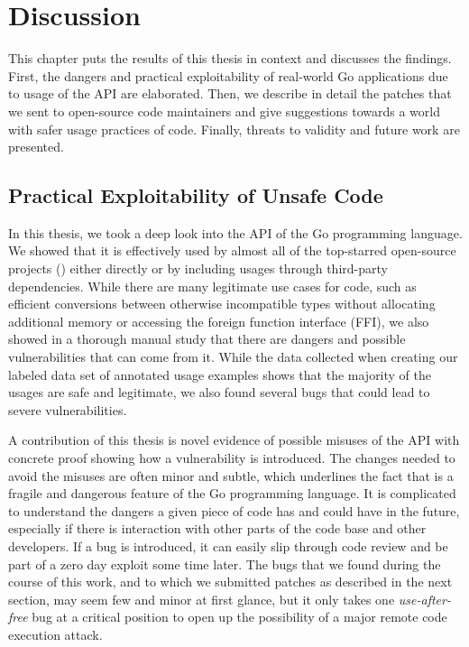 
\chapter{Discussion}\label{ch:discussion}

This chapter puts the results of this thesis in context and discusses the findings.
First, the dangers and practical exploitability of real-world Go applications due to usage of the \unsafe{} API are
elaborated.
Then, we describe in detail the patches that we sent to open-source code maintainers and give suggestions towards a
world with safer usage practices of \unsafe{} code.
Finally, threats to validity and future work are presented.



\section{Practical Exploitability of Unsafe Code}\label{sec:discussion:exploitability}

In this thesis, we took a deep look into the \unsafe{} API of the Go programming language.
We showed that it is effectively used by almost all of the \projsAnalyzed{} top-starred open-source projects
(\percentageUnsafeTransitiveWithDependencies{}) either directly or by including \unsafe{} usages through third-party
dependencies.
While there are many legitimate use cases for \unsafe{} code, such as efficient conversions between otherwise
incompatible types without allocating additional memory or accessing the foreign function interface (\acrshort{FFI}),
we also showed in a thorough manual study that there are dangers and possible vulnerabilities that can come from it.
While the data collected when creating our labeled data set of annotated \unsafe{} usage examples shows that the
majority of the usages are safe and legitimate, we also found several bugs that could lead to severe vulnerabilities.

A contribution of this thesis is novel evidence of possible misuses of the \unsafe{} \acrshort{API} with concrete proof
showing how a vulnerability is introduced.
The changes needed to avoid the misuses are often minor and subtle, which underlines the fact that \unsafe{} is a
fragile and dangerous feature of the Go programming language.
It is complicated to understand the dangers a given piece of code has and could have in the future, especially if there
is interaction with other parts of the code base and other developers.
If a bug is introduced, it can easily slip through code review and be part of a zero day exploit some time later.
The bugs that we found during the course of this work, and to which we submitted patches as described in the next
section, may seem few and minor at first glance, but it only takes one \textit{use-after-free} bug at a critical
position to open up the possibility of a major remote code execution attack.

